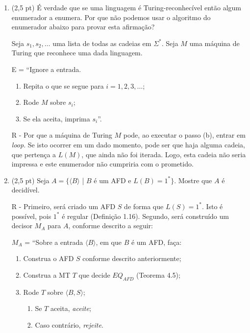 \documentclass[12pt,a4paper,oneside]{article}
\begin{document}
\begin{enumerate}
	
	\item (2,5 pt) É verdade que se uma linguagem é Turing-reconhecível então algum enumerador a enumera. Por que não podemos usar o algoritmo do enumerador abaixo para provar esta afirmação? 
	
	Seja $s_1, s_2, \ldots$ uma lista de todas as cadeias em $\Sigma^*$. Seja $M$ uma máquina de Turing que reconhece uma dada linguagem.

E = ``Ignore a entrada.
	\begin{enumerate}
		\item Repita o que se segue para $i = 1,2,3, \ldots$;
		\item Rode $M$ sobre $s_i$;
		\item Se ela aceita, imprima $s_i$''.
	\end{enumerate}
	
	\vspace{0.3cm}
	
	{ \color{blue}
	R - Por que a máquina de Turing $M$ pode, ao executar o passo (b), entrar em {\it loop}. Se isto ocorrer em um dado momento, pode ser que haja alguma cadeia, que pertença a $L(M)$, que ainda não foi iterada. Logo, esta cadeia não seria impressa e este enumerador não cumpriria com o prometido.
	}
	
	\item (2,5 pt)  Seja $A = \{ \langle B \rangle$ | $B$ é um AFD e $L(B) = 1^* \}$. Mostre que $A$ é decidível.
	
	\vspace{0.3cm}
	
	{\color{blue}
		R - Primeiro, será criado um AFD $S$ de forma que $L(S) = 1^*$. Isto é possível, pois $1^*$ é regular (Definição 1.16). Segundo, será construído um decisor $M_A$ para $A$, conforme descrito a seguir:
		
		$M_A$ = ``Sobre a entrada $\langle B \rangle$, em que $B$ é um AFD, faça:
			\begin{enumerate}
				\item Construa o AFD $S$ conforme descrito anteriormente;
				\item Construa a MT $T$ que decide $EQ_{AFD}$ (Teorema 4.5);
				\item Rode $T$ sobre $\langle B, S \rangle$;
				\begin{enumerate}
					\item Se $T$ aceita, {\it aceite};
					\item Caso contrário, {\it rejeite}.
				\end{enumerate}					
			\end{enumerate}
		
}
\end{enumerate}
\end{document}
